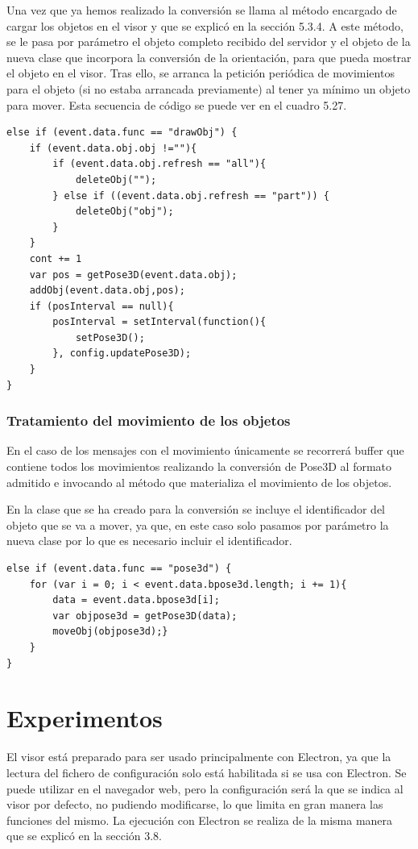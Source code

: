 Una vez que ya hemos realizado la conversión se llama al método encargado de cargar los objetos en el visor y que se explicó en la sección 5.3.4. A este método, se le pasa por parámetro el objeto completo recibido del servidor y el objeto de la nueva clase que incorpora la conversión de la orientación, para que pueda mostrar el objeto en el visor. Tras ello, se arranca la petición periódica de movimientos para el objeto (si no estaba arrancada previamente) al tener ya mínimo un objeto para mover. Esta secuencia de código se puede ver en el cuadro 5.27.

\begin{lstlisting}[caption= Código para tratar los mensajes con el objeto 3D, label=cod.tratarobjetos]
else if (event.data.func == "drawObj") {
	if (event.data.obj.obj !=""){
		if (event.data.obj.refresh == "all"){
			deleteObj("");
		} else if ((event.data.obj.refresh == "part")) {
			deleteObj("obj");
		}
	}
	cont += 1
	var pos = getPose3D(event.data.obj);
	addObj(event.data.obj,pos);
	if (posInterval == null){
		posInterval = setInterval(function(){
			setPose3D();
		}, config.updatePose3D);
	}
}	
\end{lstlisting}

\subsubsection{Tratamiento del movimiento de los objetos}
En el caso de los mensajes con el movimiento únicamente se recorrerá buffer que contiene todos los movimientos realizando la conversión de Pose3D al formato admitido e invocando al método que materializa el movimiento de los objetos. 

En la clase que se ha creado para la conversión se incluye el identificador del objeto que se va a mover, ya que, en este caso solo pasamos por parámetro la nueva clase por lo que es necesario incluir el identificador.

\begin{lstlisting}[caption= Código para tratar los mensajes con los movimientos de los objetos 3D, label=cod.tratarmovimiento]
else if (event.data.func == "pose3d") {
	for (var i = 0; i < event.data.bpose3d.length; i += 1){
		data = event.data.bpose3d[i];
		var objpose3d = getPose3D(data);
		moveObj(objpose3d);}
	}
}
\end{lstlisting}

\section{Experimentos}
El visor está preparado para ser usado principalmente con Electron, ya que la lectura del fichero de configuración solo está habilitada si se usa con Electron. Se puede utilizar en el navegador web, pero la configuración será la que se indica al visor por defecto, no pudiendo modificarse, lo que limita en gran manera las funciones del mismo. La ejecución con Electron se realiza de la misma manera que se explicó en la sección 3.8.

